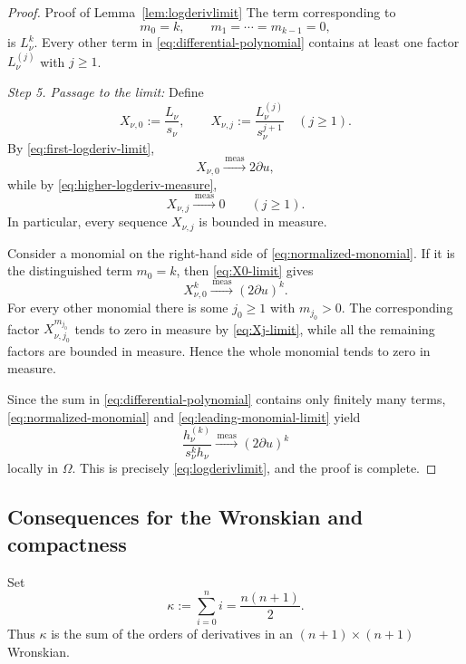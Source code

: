 \documentclass[12pt,letterpaper,reqno]{amsart}
\theoremstyle{definition}
\numberwithin{equation}{section}
\newcommand{\convmeas}{\xrightarrow{\,\mathrm{meas}\,}}
\begin{document}
\begin{proof}{Proof of Lemma~\ref{lem:logderivlimit}}
The term corresponding to
\[
m_0=k,
\qquad
m_1=\cdots=m_{k-1}=0,
\]
is \(L_\nu^k\). Every other term in
\eqref{eq:differential-polynomial} contains at least one factor
\(L_\nu^{(j)}\) with \(j\geq1\).

\medskip\noindent
\emph{{Step 5. Passage to the limit:}}
Define
\[
X_{\nu,0}:=\frac{L_\nu}{s_\nu},
\qquad
X_{\nu,j}
 :=
 \frac{L_\nu^{(j)}}{s_\nu^{j+1}}
 \quad(j\geq1).
\]
By \eqref{eq:first-logderiv-limit},
\begin{equation}\label{eq:X0-limit}
 X_{\nu,0}
 \convmeas
 2\partial u,
\end{equation}
while by \eqref{eq:higher-logderiv-measure},
\begin{equation}\label{eq:Xj-limit}
 X_{\nu,j}\convmeas0
 \qquad(j\geq1).
\end{equation}
In particular, every sequence \(X_{\nu,j}\) is bounded in measure.

Consider a monomial on the right-hand side of
\eqref{eq:normalized-monomial}. If it is the distinguished term
\(m_0=k\), then \eqref{eq:X0-limit} gives
\begin{equation}\label{eq:leading-monomial-limit}
 X_{\nu,0}^k
 \convmeas
 (2\partial u)^k.
\end{equation}
For every other monomial there is some \(j_0\geq1\) with
\(m_{j_0}>0\). The corresponding factor
\(X_{\nu,j_0}^{m_{j_0}}\) tends to zero in measure by
\eqref{eq:Xj-limit}, while all the remaining factors are bounded in
measure. Hence the whole monomial tends to zero in measure.

Since the sum in \eqref{eq:differential-polynomial} contains only
finitely many terms, \eqref{eq:normalized-monomial} and
\eqref{eq:leading-monomial-limit} yield
\[
 \frac{h_\nu^{(k)}}{s_\nu^kh_\nu}
 \convmeas
 (2\partial u)^k
\]
locally in \(\Omega\). This is precisely
\eqref{eq:logderivlimit}, and the proof is complete.
\end{proof}

\subsection{Consequences for the Wronskian and compactness}

Set
\[
\kappa:=\sum_{i=0}^{n}i=\frac{n(n+1)}2.
\]
Thus \(\kappa\) is the sum of the orders of derivatives
in an $(n+1)\times(n+1)$
Wronskian.
\end{document}
